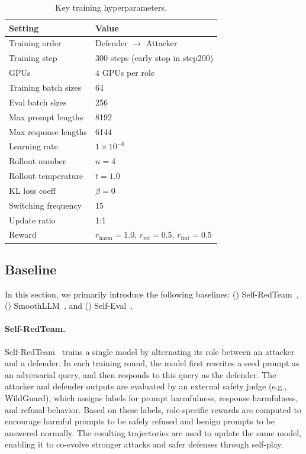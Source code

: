 \documentclass[11pt, letterpaper]{template}
\theoremstyle{plain}
\theoremstyle{definition}
\theoremstyle{remark}
\begin{document}
\begin{table}[ht]
\centering
\caption{Key training hyperparameters.}
\label{tab:training-setup}
\footnotesize
\begin{tabular}{ll}
\toprule
\textbf{Setting} & \textbf{Value} \\
\midrule
Training order & Defender $\rightarrow$ Attacker \\
Training step & 300 steps (early stop in step200) \\
GPUs & 4 GPUs per role\\
Training batch sizes & 64 \\
Eval batch sizes & 256 \\
Max prompt lengths & 8192\\
Max response lengths & 6144 \\
Learning rate & $1\times10^{-6}$ \\
Rollout number & $n=4$ \\
Rollout temperature & $t=1.0$ \\
KL loss coeff & $\beta=0$ \\
Switching frequency & 15 \\ 
Update ratio & 1:1 \\
Reward & $r_{\text {harm}}=1.0$, $r_{\text{ref}}=0.5$, $r_{\text{fmt}}=0.5$ \\
\bottomrule
\end{tabular}
\end{table}

\subsection{Baseline}
In this section, we primarily introduce the following baselines: () Self-RedTeam~\citep{liu2025chasing}, () SmoothLLM~\citep{robey2023smoothllm}, and () Self-Eval~\citep{phute2023llm}.

\paragraph{Self-RedTeam.}
Self-RedTeam~\citep{liu2025chasing} trains a single model by alternating its role between an attacker and a defender. In each training round, the model first rewrites a seed prompt as an adversarial query, and then responds to this query as the defender. The attacker and defender outputs are evaluated by an external safety judge (e.g., WildGuard), which assigns labels for prompt harmfulness, response harmfulness, and refusal behavior. Based on these labels, role-specific rewards are computed to encourage harmful prompts to be safely refused and benign prompts to be answered normally. The resulting trajectories are used to update the same model, enabling it to co-evolve stronger attacks and safer defenses through self-play.
\end{document}

